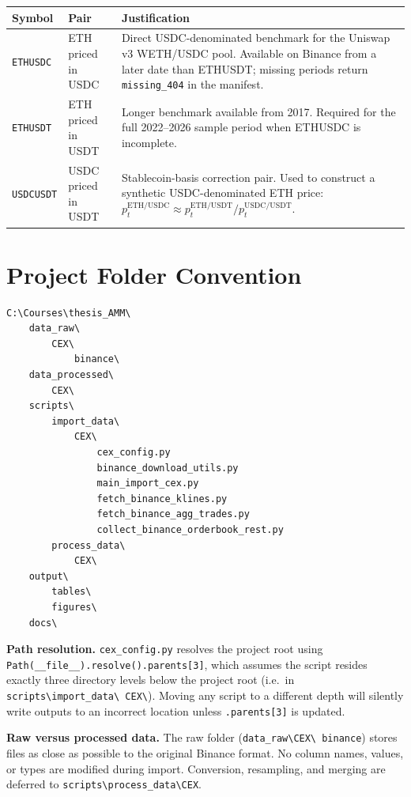 \documentclass[11pt,a4paper]{article}
\begin{document}
\begin{xltabular}{\linewidth}{L{2.6cm}L{3.2cm}Y}
\toprule
\textbf{Symbol} & \textbf{Pair} & \textbf{Justification} \\
\midrule
\texttt{ETHUSDC} & ETH priced in USDC & Direct USDC-denominated benchmark
  for the Uniswap v3 WETH/USDC pool. Available on Binance from a later
  date than ETHUSDT; missing periods return \texttt{missing\_404} in
  the manifest. \\
\texttt{ETHUSDT} & ETH priced in USDT & Longer benchmark available from
  2017. Required for the full 2022--2026 sample period when ETHUSDC
  is incomplete. \\
\texttt{USDCUSDT} & USDC priced in USDT & Stablecoin-basis correction
  pair. Used to construct a synthetic USDC-denominated ETH price:
  $p^{\mathrm{ETH/USDC}}_t \approx p^{\mathrm{ETH/USDT}}_t /
  p^{\mathrm{USDC/USDT}}_t$. \\
\bottomrule
\end{xltabular}

\section{Project Folder Convention}
\label{sec:paths}

\begin{lstlisting}
C:\Courses\thesis_AMM\
    data_raw\
        CEX\
            binance\
    data_processed\
        CEX\
    scripts\
        import_data\
            CEX\
                cex_config.py
                binance_download_utils.py
                main_import_cex.py
                fetch_binance_klines.py
                fetch_binance_agg_trades.py
                collect_binance_orderbook_rest.py
        process_data\
            CEX\
    output\
        tables\
        figures\
    docs\
\end{lstlisting}

\noindent\textbf{Path resolution.}
\texttt{cex\_config.py} resolves the project root using
\texttt{Path(\_\_file\_\_).resolve().parents[3]}, which assumes the
script resides exactly three directory levels below the project root
(i.e.\ in \texttt{scripts\textbackslash import\_data\textbackslash
CEX\textbackslash}). Moving any script to a different depth will
silently write outputs to an incorrect location unless
\texttt{.parents[3]} is updated.

\noindent\textbf{Raw versus processed data.}
The raw folder (\texttt{data\_raw\textbackslash CEX\textbackslash
binance}) stores files as close as possible to the original Binance
format. No column names, values, or types are modified during import.
Conversion, resampling, and merging are deferred to
\texttt{scripts\textbackslash process\_data\textbackslash CEX}.
\end{document}
